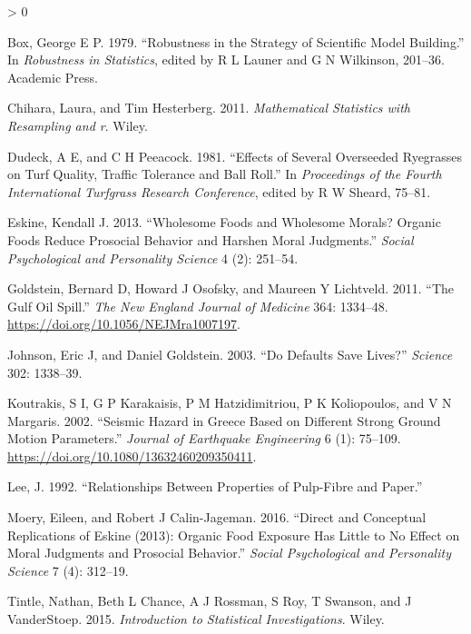 \documentclass[
]{book}
\theoremstyle{plain}
\theoremstyle{mydefn}
\theoremstyle{myexmpl}
\theoremstyle{remark}
\newlength{\cslhangindent}
\newenvironment{CSLReferences}[2] %
 {%
  \setlength{\parindent}{0pt}
  \ifodd #1 \everypar{\setlength{\hangindent}{\cslhangindent}}\ignorespaces\fi
  \ifnum #2 > 0
  \setlength{\parskip}{#2\baselineskip}
  \fi
 }%
 {}
\begin{document}
\hypertarget{refs}{}
\begin{CSLReferences}{1}{0}
\leavevmode\hypertarget{ref-Box1979}{}%
Box, George E P. 1979. {``Robustness in the Strategy of Scientific Model Building.''} In \emph{Robustness in Statistics}, edited by R L Launer and G N Wilkinson, 201--36. Academic Press.

\leavevmode\hypertarget{ref-Chihara2011}{}%
Chihara, Laura, and Tim Hesterberg. 2011. \emph{Mathematical Statistics with Resampling and r}. Wiley.

\leavevmode\hypertarget{ref-Dudeck1981}{}%
Dudeck, A E, and C H Peeacock. 1981. {``Effects of Several Overseeded Ryegrasses on Turf Quality, Traffic Tolerance and Ball Roll.''} In \emph{Proceedings of the Fourth International Turfgrass Research Conference}, edited by R W Sheard, 75--81.

\leavevmode\hypertarget{ref-Eskine2013}{}%
Eskine, Kendall J. 2013. {``Wholesome Foods and Wholesome Morals? Organic Foods Reduce Prosocial Behavior and Harshen Moral Judgments.''} \emph{Social Psychological and Personality Science} 4 (2): 251--54.

\leavevmode\hypertarget{ref-Goldstein2011}{}%
Goldstein, Bernard D, Howard J Osofsky, and Maureen Y Lichtveld. 2011. {``The Gulf Oil Spill.''} \emph{The New England Journal of Medicine} 364: 1334--48. \url{https://doi.org/10.1056/NEJMra1007197}.

\leavevmode\hypertarget{ref-Johnson2003}{}%
Johnson, Eric J, and Daniel Goldstein. 2003. {``Do Defaults Save Lives?''} \emph{Science} 302: 1338--39.

\leavevmode\hypertarget{ref-Koutrakis2002}{}%
Koutrakis, S I, G P Karakaisis, P M Hatzidimitriou, P K Koliopoulos, and V N Margaris. 2002. {``Seismic Hazard in Greece Based on Different Strong Ground Motion Parameters.''} \emph{Journal of Earthquake Engineering} 6 (1): 75--109. \url{https://doi.org/10.1080/13632460209350411}.

\leavevmode\hypertarget{ref-Lee1992}{}%
Lee, J. 1992. {``Relationships Between Properties of Pulp-Fibre and Paper.''}

\leavevmode\hypertarget{ref-Moery2016}{}%
Moery, Eileen, and Robert J Calin-Jageman. 2016. {``Direct and Conceptual Replications of Eskine (2013): Organic Food Exposure Has Little to No Effect on Moral Judgments and Prosocial Behavior.''} \emph{Social Psychological and Personality Science} 7 (4): 312--19.

\leavevmode\hypertarget{ref-Tintle2015}{}%
Tintle, Nathan, Beth L Chance, A J Rossman, S Roy, T Swanson, and J VanderStoep. 2015. \emph{Introduction to Statistical Investigations}. Wiley.

\end{CSLReferences}
\end{document}
